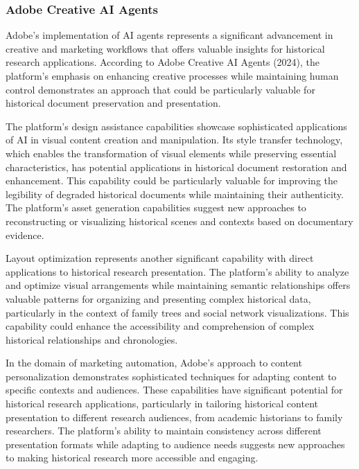 \documentclass[
]{article}
\begin{document}
\subsubsection{Adobe Creative AI Agents}\label{adobe-creative-ai-agents}

Adobe's implementation of AI agents represents a significant advancement
in creative and marketing workflows that offers valuable insights for
historical research applications. According to Adobe Creative AI Agents
(2024), the platform's emphasis on enhancing creative processes while
maintaining human control demonstrates an approach that could be
particularly valuable for historical document preservation and
presentation.

The platform's design assistance capabilities showcase sophisticated
applications of AI in visual content creation and manipulation. Its
style transfer technology, which enables the transformation of visual
elements while preserving essential characteristics, has potential
applications in historical document restoration and enhancement. This
capability could be particularly valuable for improving the legibility
of degraded historical documents while maintaining their authenticity.
The platform's asset generation capabilities suggest new approaches to
reconstructing or visualizing historical scenes and contexts based on
documentary evidence.

Layout optimization represents another significant capability with
direct applications to historical research presentation. The platform's
ability to analyze and optimize visual arrangements while maintaining
semantic relationships offers valuable patterns for organizing and
presenting complex historical data, particularly in the context of
family trees and social network visualizations. This capability could
enhance the accessibility and comprehension of complex historical
relationships and chronologies.

In the domain of marketing automation, Adobe's approach to content
personalization demonstrates sophisticated techniques for adapting
content to specific contexts and audiences. These capabilities have
significant potential for historical research applications, particularly
in tailoring historical content presentation to different research
audiences, from academic historians to family researchers. The
platform's ability to maintain consistency across different presentation
formats while adapting to audience needs suggests new approaches to
making historical research more accessible and engaging.
\end{document}
